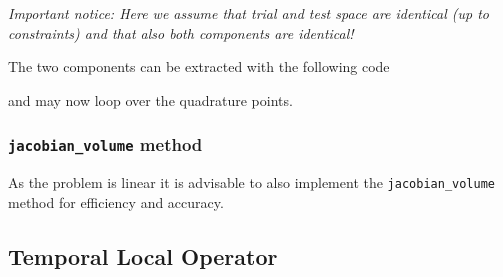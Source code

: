 \documentclass[a4paper,12pt]{article}
\theoremstyle{definition}
\theoremstyle{definition}
\begin{document}
\textit{Important notice: Here we assume that trial and test space are identical
(up to constraints) and that also both components are identical!}

The two components can be extracted with the following code



and may now loop over the quadrature points.














\subsubsection*{\lstinline{jacobian_volume} method}

As the problem is linear it is advisable to also implement the
\lstinline{jacobian_volume} method for efficiency and accuracy.

%
%
%



\subsection{Temporal Local Operator}
\end{document}
